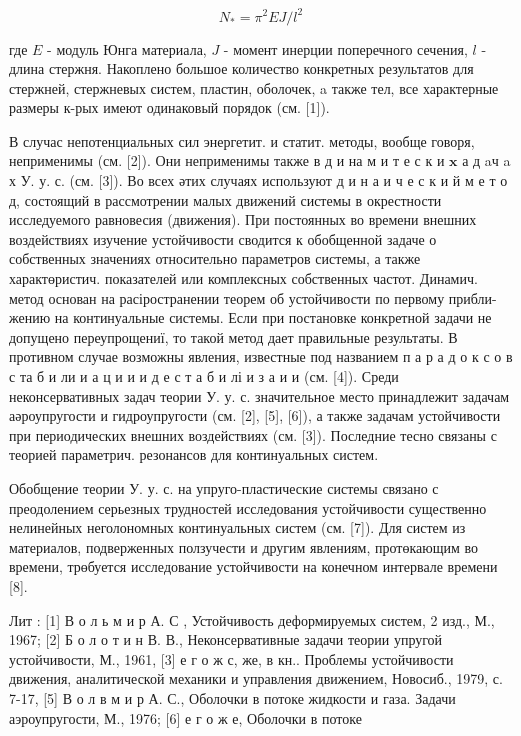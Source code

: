 \documentclass[10pt]{article}
\begin{document}
\[

N_{*}=\pi^{2} E J / l^{2}

\]



где $E$ - модуль Юнга материала, $J$ - момент инерции поперечного сечения, $l$ - длина стержня. Накоплено большое количество конкретных результатов для стержней, стержневых систем, пластин, оболочек, a также тел, все характерные размеры к-рых имеют одинаковый порядок (см. [1]).



В случас непотенциальных сил энергетит. и статит. методы, вообще говоря, неприменимы (см. [2]). Они неприменимы также в д и на м и т е с к и $\mathbf{x}$ а д aч a х У. у. с. (см. [3]). Во всех әтих случаях используют д и н а и ч е с к и й м е т о д, состоящий в рассмотрении малых движений системы в окрестности исследуемого равновесия (движения). При постоянных во времени внешних воздействиях изучение устойчивости сводится к обобщенной задаче о собственных значениях относительно параметров системы, а также характөристич. показателей или комплексных собственных частот. Динамич. метод основан на расіространении теорем об устойчивости по первому прибли- жению на континуальные системы. Если при постановке конкретной задачи не допущено переупрощениї, то такой метод дает правильные результаты. В противном случае возможны явления, известные под названием п а р а д о к с о в с та б и ли и а ц и и и д е с т а б и лі и з а и и (см. [4]). Среди неконсервативных задач теории У. у. с. значительное место принадлежит задачам аәроупругости и гидроупругости (см. [2], [5], [6]), а также задачам устойчивости при периодических внешних воздействиях (см. [3]). Последние тесно связаны с теорией параметрич. резонансов для континуальных систем.



Обобщение теории У. у. с. на упруго-пластические системы связано с преодолением серьезных трудностей исследования устойчивости существенно нелинейных неголономных континуальных систем (см. [7]). Для систем из материалов, подверженных ползучести и другим явлениям, протөкающим во времени, трөбуется исследование устойчивости на конечном интервале времени [8].



Лит : [1] В о л ь м и р А. С , Устойчивость деформируемых систем, 2 изд., М., 1967; [2] Б о л о т и н В. В., Неконсервативные задачи теории упругой устойчивости, М., 1961, [3] е г о ж с, же, в кн.. Проблемы устойчивости движения, аналитической механики и управления движением, Новосиб., 1979, с. 7-17, [5] В о л в м и р А. С., Оболочки в потоке жидкости и газа. Задачи аэроупругости, М., 1976; [6] е г о ж е, Оболочки в потоке
\end{document}
